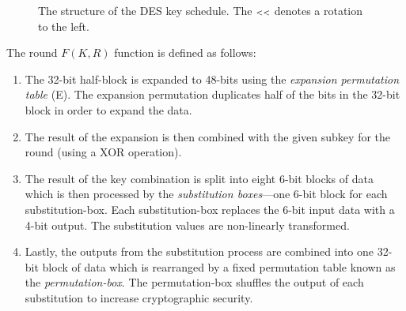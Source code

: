 \begin{figure}[H]
    \caption{The structure of the DES key schedule. The $\mathsmaller{<<}$ denotes a rotation to the left.}
\end{figure}

The round $F(K, R)$ function is defined as follows:

\begin{enumerate}
    \item The 32-bit half-block is expanded to 48-bits using the \textit{expansion permutation table} (E). The expansion permutation duplicates half of the bits in the 
          32-bit block in order to expand the data. 
    \item The result of the expansion is then combined with the given subkey for the round (using a XOR operation).
    \item The result of the key combination is split into eight 6-bit blocks of data which is then processed by the \textit{substitution boxes}---one 6-bit block for 
    each substitution-box. Each substitution-box replaces the 6-bit input data with a 4-bit output. The substitution values are non-linearly transformed.
    \item Lastly, the outputs from the substitution process are combined into one 32-bit block of data which is rearranged by a fixed permutation table known as the
        \textit{permutation-box}. The permutation-box shuffles the output of each substitution to increase cryptographic security.
\end{enumerate}

